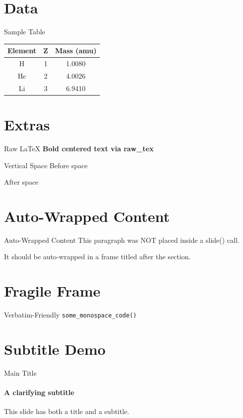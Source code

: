 \documentclass{beamer}%
\begin{document}
\section{Data}%
\begin{frame}{Sample Table}%
\centering%
\begin{tabular}{ccc}%
\hline%
Element&Z&Mass (amu)\\%
\hline%
H&1&1.0080\\%
\hline%
He&2&4.0026\\%
\hline%
Li&3&6.9410\\%
\hline%
\end{tabular}%
%
\end{frame}%
\section{Extras}%
\begin{frame}{Raw LaTeX}%
\centering \textbf{Bold centered text via raw\_tex}%
\end{frame}%
\begin{frame}{Vertical Space}%
Before space%
\par%
\vspace{1cm}%
After space%
\par%
\end{frame}%
\section{Auto{-}Wrapped Content}%
\begin{frame}{Auto{-}Wrapped Content}%
This paragraph was NOT placed inside a slide() call.%
\par%
It should be auto{-}wrapped in a frame titled after the section.%
\par%
\end{frame}%
\section{Fragile Frame}%
\begin{frame}[fragile]{Verbatim{-}Friendly}%
\texttt{some\_monospace\_code()}%
\end{frame}
%
\section{Subtitle Demo}%
\begin{frame}{Main Title}%
\framesubtitle{A clarifying subtitle}%
This slide has both a title and a subtitle.%
\par%
\end{frame}%
\end{document}
